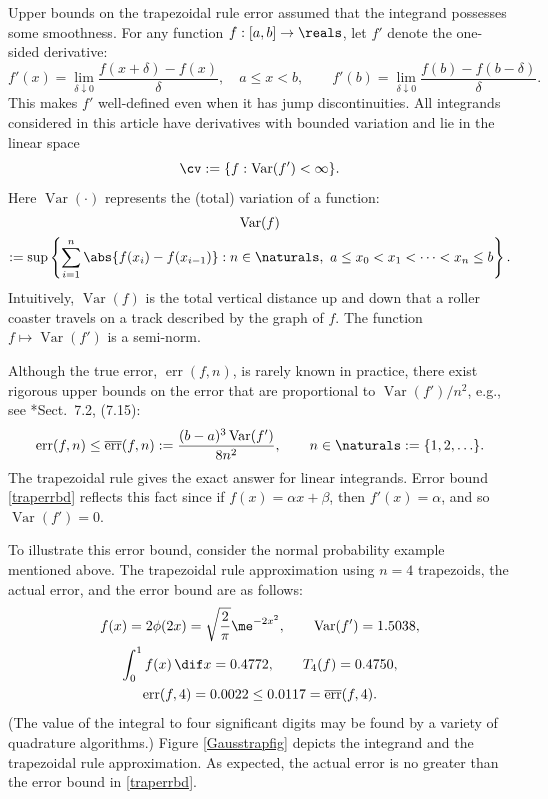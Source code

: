 \documentclass[]{article}
\DeclareMathOperator{\Var}{Var}
\DeclareMathOperator{\err}{err}
\newcommand{\oerr}{\overline{\err}}
\theoremstyle{definition}
\theoremstyle{remark}
\begin{document}
Upper bounds on the trapezoidal rule error assumed that the integrand possesses some smoothness.  For any function $f:[a,b]\to \reals$, let $f'$ denote the one-sided derivative:
\[
f'(x)=\lim_{\delta \downarrow 0} \frac{f(x+\delta)-f(x)}{\delta}, \quad a \le x < b, \qquad f'(b)=\lim_{\delta \downarrow 0} \frac{f(b)-f(b-\delta)}{\delta}.
\]
This makes $f'$ well-defined even when it has jump discontinuities.  All integrands considered in this article have derivatives with bounded variation and lie in the linear space
\[
\cv:=\{f : \Var(f')<\infty \}.
\]
Here $\Var(\cdot)$ represents the (total) variation of a function:
\begin{multline} \label{vardef}
\Var(f) \\
:= \sup \left \{ \sum_{i=1}^n \abs{f(x_i)-f(x_{i-1})} : n \in \naturals, \ a \le x_0 < x_1 < \cdots < x_{n} \le b \right\}.
\end{multline}
Intuitively, $\Var(f)$ is the total vertical distance up and down that a roller coaster travels on a track described by the graph of $f$. The function $f \mapsto \Var(f')$ is a semi-norm. 

Although the true error, $\err(f,n)$, is rarely known in practice, there exist rigorous upper bounds on the error that are proportional to $\Var(f')/n^2$, e.g., see *{Sect.\ 7.2, (7.15)}: 
\begin{equation} \label{traperrbd}
\err(f,n) \le \oerr(f,n):=\frac{(b-a)^3\Var(f')}{8n^2}, \qquad n \in \naturals := \{1, 2, \ldots \}. 
\end{equation}
The trapezoidal rule gives the exact answer for linear integrands.  Error bound \eqref{traperrbd} reflects this fact since if $f(x)=\alpha x+\beta$, then $f'(x)=\alpha$, and so $\Var(f')=0$.

To illustrate this error bound, consider the normal probability example mentioned above.  The trapezoidal rule approximation using $n=4$ trapezoids, the actual error, and the error bound are as follows:
\begin{subequations} \label{GaussExample}
\begin{gather}
f(x) = 2\phi(2x) = \sqrt{\frac{2}{\pi}} \me^{-2x^2}, \qquad \Var(f') = 1.5038, \\
\int_0^1 f(x)  \, \dif x = 0.4772, \qquad T_{4}(f)= 0.4750, \\
\err(f,4)=0.0022 \le 0.0117 = \oerr(f,4).
\end{gather}
\end{subequations}
(The value of the integral to four significant digits may be found by a variety of quadrature algorithms.)  Figure \ref{Gausstrapfig} depicts the integrand and the trapezoidal rule approximation. As expected, the actual error is no greater than the error bound in \eqref{traperrbd}.
\end{document}
